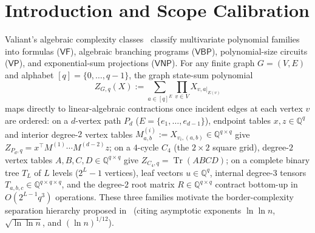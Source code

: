 \documentclass[10pt,twocolumn]{article}
\newcommand{\QQ}{\mathbb{Q}}
\begin{document}
\section{Introduction and Scope Calibration}
Valiant's algebraic complexity classes~\cite{valiant1979completeness,burgisser2000completeness,nisan1991lower} classify multivariate polynomial families into formulas ($\mathsf{VF}$), algebraic branching programs ($\mathsf{VBP}$), polynomial-size circuits ($\mathsf{VP}$), and exponential-sum projections ($\mathsf{VNP}$). For any finite graph $G=(V,E)$ and alphabet $[q]=\{0,\dots,q-1\}$, the graph state-sum polynomial
\begin{equation}
  Z_{G,q}(X) := \sum_{a \in [q]^E} \prod_{v \in V} X_{v, a|_{E(v)}}
  \label{eq:statesum}
\end{equation}
maps directly to linear-algebraic contractions once incident edges at each vertex $v$ are ordered: on a $d$-vertex path $P_d$ ($E = \{e_1,\dots,e_{d-1}\}$), endpoint tables $x,z\in\QQ^q$ and interior degree-$2$ vertex tables $M^{(i)}_{a,b} := X_{v_i,(a,b)}\in\QQ^{q\times q}$ give $Z_{P_d,q} = x^\top M^{(1)}\cdots M^{(d-2)} z$; on a $4$-cycle $C_4$ (the $2\times 2$ square grid), degree-$2$ vertex tables $A,B,C,D\in\QQ^{q\times q}$ give $Z_{C_4,q} = \operatorname{Tr}(ABCD)$; on a complete binary tree $T_L$ of $L$ levels ($2^L-1$ vertices), leaf vectors $u\in\QQ^q$, internal degree-$3$ tensors $T_{a,b,c}\in\QQ^{q\times q\times q}$, and the degree-$2$ root matrix $R\in\QQ^{q\times q}$ contract bottom-up in $O(2^{L-1} q^3)$ operations. These three families motivate the border-complexity separation hierarchy proposed in~\cite{openai2026hierarchy,openai2026vpvnp} (citing asymptotic exponents $\ln\ln n$, $\sqrt{\ln\ln n}$, and $(\ln n)^{1/12}$).
\end{document}
